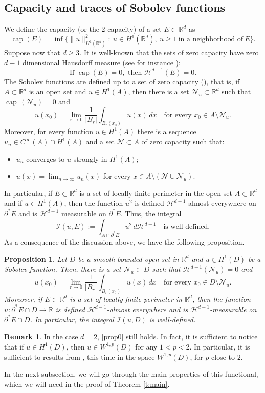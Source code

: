 \documentclass[JEP,XML,SOM,Unicode]{cedram}
\theoremstyle{plain}
\newtheorem{prop}[teo]{Proposition}
\theoremstyle{definition}
\newtheorem{oss}[teo]{Remark}
\let\ds\displaystyle
\def\R{\mathbb{R}}
\def\HH{\mathcal{H}}
\DeclareMathOperator{\cp}{cap}
\begin{document}
\subsection{Capacity and traces of Sobolev functions}
We define the capacity (or the $2$-capacity) of a set $E\subset\R^d$ as
\[\cp (E)=\inf\big\{\|u\|_{H^1(\R^d)}^2:\ u\in H^1(\R^d),\ u\ge 1\ \text{in a neighborhood of}\ E\big\}.\]
Suppose now that $d\ge 3$. It is well-known that the sets of zero capacity have zero $d-1$ dimensional Hausdorff measure (see for instance \cite[\S 4.7.2, Th.\,4]{eg}):
\[\text{If } \cp(E)=0,\text{ then } \HH^{d-1}(E)=0.\]
The Sobolev functions are defined up to a set of zero capacity (), that is, if $A\subset \R^d$ is an open set and $u\in H^1(A)$, then there is a set $\mathcal N_u\subset\R^d$ such that $\cp\,(\mathcal N_u)=0$ and
\[u(x_0)=\lim_{r\to0}\frac1{|B_r|}\int_{B_r(x_0)}u(x)\,dx\quad\text{for every } x_0\in A\setminus \mathcal N_u.\]
Moreover, for every function $u\in H^1(A)$ there is a sequence $u_n\in C^\infty(A)\cap H^1(A)$ and a set $\mathcal N\subset A$ of zero capacity such that:
\begin{itemize}
\item $u_n$ converges to $u$ strongly in $H^1(A)$;
\item $u(x)=\lim_{n\to\infty}u_n(x)$ for every $x\in A\setminus(\mathcal N\cup\mathcal N_u)$.
\end{itemize}
In particular, if $E\subset\R^d$ is a set of locally finite perimeter in the open set $A\subset\R^d$ and if $u\in H^1(A)$, then the function $u^2$ is defined $\HH^{d-1}$-almost everywhere on $\partial^\ast E$ and is $\HH^{d-1}$ measurable on $\partial^\ast E$. Thus, the integral
\[\mathcal I(u,E):=\int_{A\cap \partial^\ast E}u^2\,d\HH^{d-1}\quad\text{is well-defined}.\]
As a consequence of the discussion above, we have the following proposition.
\begin{prop}\label{prop0}
Let $D$ be a smooth bounded open set in $\R^d$ and $u\in H^1(D)$ be a Sobolev function. Then, there is a set $\mathcal N_u\subset D$ such that $\HH^{d-1}(\mathcal N_u)=0$ and \[u(x_0)=\lim_{r\to0}\frac1{|B_r|}\int_{B_r(x_0)}u(x)\,dx\quad\text{for every } x_0\in D\setminus \mathcal N_u.\]
Moreover, if $E\subset\R^d$ is a set of locally finite perimeter in $\R^d$, then the function $u:\partial^\ast E\cap D\to\R$ is defined $\HH^{d-1}$-almost everywhere and is $\HH^{d-1}$-measurable on $\partial^\ast E\cap D$. In particular, the integral
$\ds \mathcal I(u,D)$ is well-defined.
\end{prop}
\begin{oss}
In the case $d=2$, \eqref{prop0} still holds. In fact, it is sufficient to notice that if $u\in H^1(D)$, then $u\in W^{1,p}(D)$ for any $1<p<2$. In particular, it is sufficient to results from \cite{eg}, this time in the space $W^{1,p}(D)$, for $p$ close to $2$.
\end{oss}
In the next subsection, we will go through the main properties of this functional, which we will need in the proof of Theorem \ref{t:main}.
\end{document}
